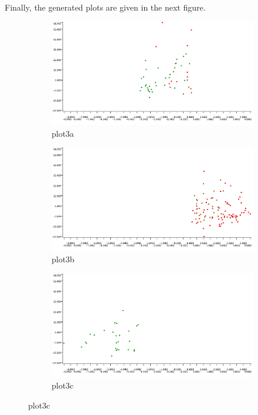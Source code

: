 \documentclass[11pt]{article}
\begin{document}
			
			Finally, the generated plots are given in the next figure.
			\iftrue
			 \begin{figure}[H]
			 	\centering
			 	\begin{subfigure}{0.4\textwidth}
			 		\includegraphics[width=\textwidth]{res/t1/t14/t14-plota}
			 		\caption{plot3a}
			 		\label{fig:first}
			 	\end{subfigure}
			 	\hfill
			 	\begin{subfigure}{0.4\textwidth}
			 		\includegraphics[width=\textwidth]{res/t1/t14/t14-plotb}
			 		\caption{plot3b}
			 		\label{fig:second}
			 	\end{subfigure}
			 	\hfill
			 	\begin{subfigure}{0.4\textwidth}
			 		\includegraphics[width=\textwidth]{res/t1/t14/t14-plotc}
			 		\caption{plot3c}
			 		\label{fig:third}
			 	\end{subfigure}
			 	\label{fig:figures} 
			 \end{figure}
\end{document}
